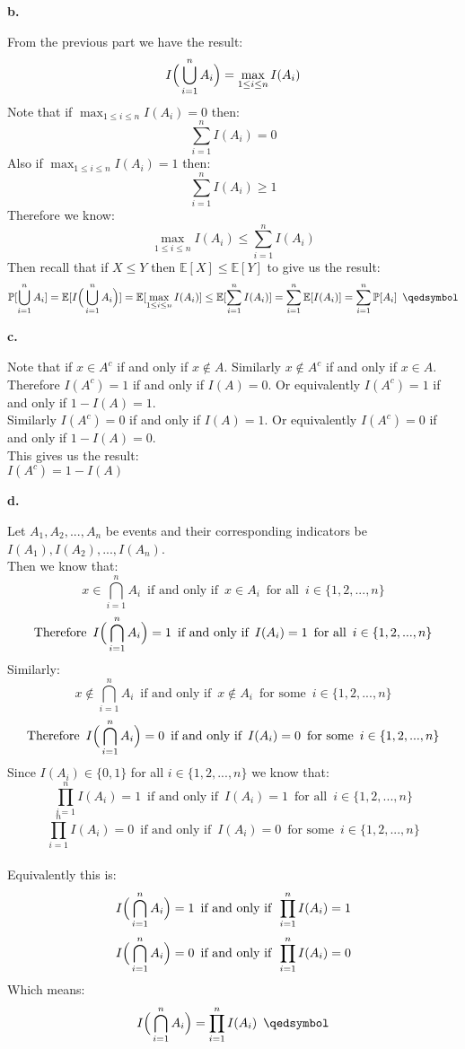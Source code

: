 \documentclass{article}
\begin{document}
\newpage
{\Large\textbf{b.}}
\begin{center}
\doublespacing
    From the previous part we have the result:
    \[I\Big{(}\bigcup _{i=1}^n A_i\Big{)} =\max_{1\leq i\leq n} I(A_i)\]
    Note that if $\max_{1\leq i\leq n} I(A_i) = 0$ then:
    \[\sum_{i=1}^n I(A_i) = 0\]
    Also if $\max_{1\leq i\leq n} I(A_i) = 1$ then:
    \[\sum_{i=1}^n I(A_i)\geq 1\]
    Therefore we know:
    \[\max_{1\leq i\leq n} I(A_i)\leq\sum_{i=1}^n I(A_i)\]
    Then recall that if $X\leq Y$ then $\mathbb{E}[X]\leq\mathbb{E}[Y]$ to give us the result:
    \[\mathbb{P}[\bigcup _{i=1}^n A_i] =\mathbb{E}[I\Big{(}\bigcup _{i=1}^n A_i\Big{)}] =\mathbb{E}[\max_{1\leq i\leq n} I(A_i)]\leq\mathbb{E}[\sum_{i=1}^n I(A_i)] =\sum_{i=1}^n\mathbb{E}[I(A_i)] =\sum_{i=1}^n\mathbb{P}[A_i]\;\:\qedsymbol\]
\end{center}

\vspace{0.5in}
{\Large\textbf{c.}}
\begin{center}
\doublespacing
    Note that if $x\in A^c$ if and only if $x\notin A$. Similarly $x\notin A^c$ if and only if $x\in A$.
    \\Therefore $I(A^c) = 1$ if and only if $I(A) = 0$. Or equivalently $I(A^c) = 1$ if and only if $1 - I(A) = 1$.
    \\Similarly $I(A^c) = 0$ if and only if $I(A) = 1$. Or equivalently $I(A^c) = 0$ if and only if $1 - I(A) = 0$.
    \break
    \\This gives us the result:
    \\$I(A^c) = 1 - I(A)$ \qedsymbol
\end{center}

\newpage
{\Large\textbf{d.}}
\begin{center}
\doublespacing
    Let $A_1, A_2, ..., A_n$ be events and their corresponding indicators be $I(A_1), I(A_2), ..., I(A_n)$.
    \\Then we know that:
    \[x\in\bigcap _{i=1}^n A_i\;\:\mbox{if and only if}\;\:x\in A_i\;\:\mbox{for all}\;\:i\in\{1, 2, ..., n\}\]
    \[\mbox{Therefore}\;\:I\Big{(}\bigcap _{i=1}^n A_i\Big{)} = 1\;\:\mbox{if and only if}\;\:I(A_i) = 1\;\:\mbox{for all}\;\:i\in\{1, 2, ..., n\}\]
    Similarly:
    \[x\notin\bigcap _{i=1}^n A_i\;\:\mbox{if and only if}\;\:x\notin A_i\;\:\mbox{for some}\;\:i\in\{1, 2, ..., n\}\]
    \[\mbox{Therefore}\;\:I\Big{(}\bigcap _{i=1}^n A_i\Big{)} = 0\;\:\mbox{if and only if}\;\:I(A_i) = 0\;\:\mbox{for some}\;\:i\in\{1, 2, ..., n\}\]
    Since $I(A_i)\in\{0, 1\}$ for all $i\in\{1, 2, ..., n\}$ we know that:
    \[\prod_{i=1}^n I(A_i) = 1\;\:\mbox{if and only if}\;\:I(A_i) = 1\;\:\mbox{for all}\;\:i\in\{1, 2, ..., n\}\]
    \[\prod_{i=1}^n I(A_i) = 0\;\:\mbox{if and only if}\;\:I(A_i) = 0\;\:\mbox{for some}\;\:i\in\{1, 2, ..., n\}\]
    \break
    \\Equivalently this is:
    \[I\Big{(}\bigcap _{i=1}^n A_i\Big{)} = 1\;\:\mbox{if and only if}\;\:\prod_{i=1}^n I(A_i) = 1\]
    \[I\Big{(}\bigcap _{i=1}^n A_i\Big{)} = 0\;\:\mbox{if and only if}\;\:\prod_{i=1}^n I(A_i) = 0\]
    Which means:
    \[I\Big{(}\bigcap _{i=1}^n A_i\Big{)} =\prod_{i=1}^n I(A_i)\;\:\qedsymbol\]
\end{center}
\end{document}
